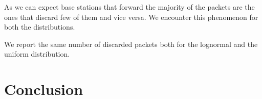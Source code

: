 \documentclass{report}
\begin{document}
\begin{flushleft}
As we can expect base stations that forward the majority of the packets are the ones that discard few of them and vice versa. We encounter this phenomenon for both the distributions.
\vspace{1em}

We report the same number of discarded packets both for the lognormal and the uniform distribution.
\end{flushleft}


\chapter{Conclusion}
\appendix



\end{document}
